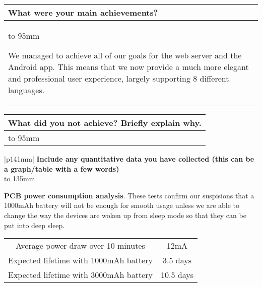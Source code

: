 \documentclass[a4paper]{article}
\newcommand{\colWidth}{141mm}
\begin{document}
\begin{center}

\begin{tabular}{|p{\colWidth}|}
	\hline
	\cellcolor{blue!25}\large
	\textbf{What were your main achievements?}
	\\ \hline
	\vtop to 95mm{
		We managed to achieve all of our goals for the web server and the Android app.
		This means that we now provide a much more elegant and professional user experience,
		largely supporting 8 different languages.

  }
  \\
  \hline
\end{tabular}
\vskip 5mm


\begin{tabular}{|p{\colWidth}|}
	\hline
	\cellcolor{blue!25}\large
	\textbf{What did you not achieve? Briefly explain why.}
	\\ \hline
	\vtop to 95mm{

  }
  \\
  \hline
\end{tabular}
\vskip 5mm


\begin{tabular}{|p{\colWidth}|}
	\hline
	\large
	\textbf{Include any quantitative data you have collected (this can be a graph/table with a few words)}
	\\ \hline
	\vtop to 135mm{

	\textbf{PCB power consumption analysis}. These tests confirm our suspisions that a 1000mAh battery will not be enough for smooth usage unless
	we are able to change the way the devices are woken up from sleep mode so that they can be put into deep sleep.

	\vspace{3mm}

	\begin{tabular}{| c | c |} \hline
		Average power draw over 10 minutes & 12mA \\
		Expected lifetime with 1000mAh battery & 3.5 days \\
		Expected lifetime with 3000mAh battery & 10.5 days \\ \hline
	\end{tabular}

}
\end{tabular}
\end{center}
\end{document}
